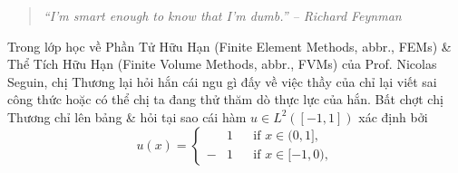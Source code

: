 \documentclass[12pt]{article}
\begin{document}
\begin{quote}\it
	``I'm smart enough to know that I'm dumb.'' -- {\sc Richard Feynman}
\end{quote}
Trong lớp học về Phần Tử Hữu Hạn (Finite Element Methods, abbr., FEMs) \& Thể Tích Hữu Hạn (Finite Volume Methods, abbr., FVMs) của Prof. {\sc Nicolas Seguin}, chị Thương lại hỏi hắn cái ngu gì đấy về việc thầy của chỉ lại viết sai công thức hoặc có thể chị ta đang thử thăm dò thực lực của hắn. Bất chợt chị Thương chỉ lên bảng \& hỏi tại sao cái hàm $u\in L^2([-1,1])$ xác định bởi
\begin{equation*}
	u(x) = \left\{\begin{split}
		&1&&\mbox{if } x\in(0,1],\\
		-&1&&\mbox{if } x\in[-1,0),
	\end{split}\right.
\end{equation*}
\end{document}
